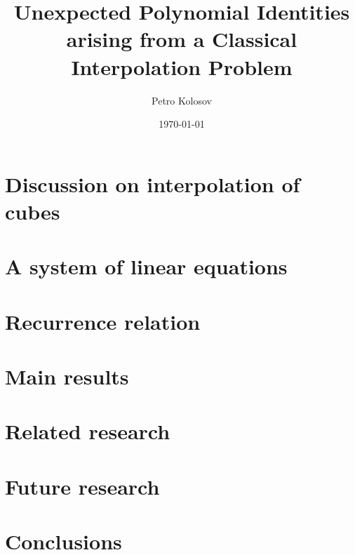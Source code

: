 \documentclass[12pt,letterpaper,oneside,reqno]{amsart}
\title[Unexpected Polynomial Identities arising from a Class. Interpolation Problem]
{Unexpected Polynomial Identities arising from a Classical Interpolation Problem}
\author[Petro Kolosov]{Petro Kolosov}
\date{\today}
\begin{document}
    \maketitle

    \begin{abstract}
        
    \end{abstract}

    \tableofcontents


    \section{Discussion on interpolation of cubes}
    \label{sec:the-problem-of-interpolation-of-cubes}
    


    \section{A system of linear equations}
    \label{sec:system-of-linear-equations-approach}
    


    \section{Recurrence relation}
    \label{sec:recurrence-relation-approach}
    


    \section{Main results}
    \label{sec:main-results}
    


    \section{Related research}\label{sec:related-research}
    


    \section{Future research}\label{sec:future-research}
    


    \section{Conclusions}\label{sec:conclusions}
    
\end{document}
